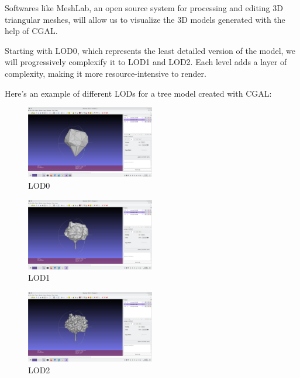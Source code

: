 \documentclass[12pt]{article}
\begin{document}
Softwares like MeshLab, an open source system for processing and editing 3D
triangular meshes\cite{meshlab}, will allow us to visualize the 3D models
generated with the help of CGAL.

Starting with LOD0, which represents the least detailed version of the model,
we will progressively complexify it to LOD1 and LOD2.
Each level adds a layer of complexity, making it more resource-intensive to render.

Here's an example of different LODs for a tree model created
with CGAL:

\begin{figure}[H]
    \centering
    \includegraphics[width=0.5\textwidth]{images/LOD0.png}
    \caption{LOD0}
\end{figure}

\begin{figure}[H]
    \centering
    \includegraphics[width=0.5\textwidth]{images/LOD1.png}
    \caption{LOD1}
\end{figure}

\begin{figure}[H]
    \centering
    \includegraphics[width=0.5\textwidth]{images/LOD2.png}
    \caption{LOD2}
\end{figure}
\end{document}
